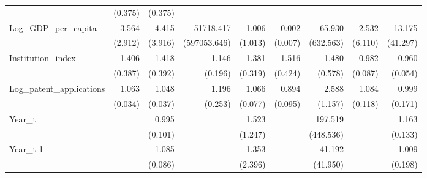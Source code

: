 \begin{table}[htbp]
\begin{tabular}{l*{8}{D{.}{.}{-1}}}
                    &     (0.375)         &     (0.375)         &                     &                     &                     &                     &                     &                     \\
Log\_GDP\_per\_capita  &       3.564         &       4.415\sym{*}  &   51718.417         &       1.006         &       0.002         &      65.930         &       2.532         &      13.175         \\
                    &     (2.912)         &     (3.916)         &(597053.646)         &     (1.013)         &     (0.007)         &   (632.563)         &     (6.110)         &    (41.297)         \\
Institution\_index   &       1.406         &       1.418         &       1.146         &       1.381         &       1.516         &       1.480         &       0.982         &       0.960         \\
                    &     (0.387)         &     (0.392)         &     (0.196)         &     (0.319)         &     (0.424)         &     (0.578)         &     (0.087)         &     (0.054)         \\
Log\_patent\_applications&       1.063\sym{*}  &       1.048         &       1.196         &       1.066         &       0.894         &       2.588\sym{**} &       1.084         &       0.999         \\
                    &     (0.034)         &     (0.037)         &     (0.253)         &     (0.077)         &     (0.095)         &     (1.157)         &     (0.118)         &     (0.171)         \\
Year\_t              &                     &       0.995         &                     &       1.523         &                     &     197.519\sym{**} &                     &       1.163         \\
                    &                     &     (0.101)         &                     &     (1.247)         &                     &   (448.536)         &                     &     (0.133)         \\
Year\_t-1            &                     &       1.085         &                     &       1.353         &                     &      41.192\sym{***}&                     &       1.009         \\
                    &                     &     (0.086)         &                     &     (2.396)         &                     &    (41.950)         &                     &     (0.198)         \\

\end{tabular}
\end{table}
